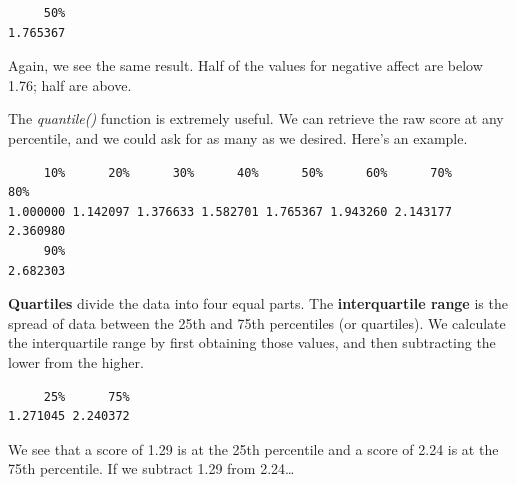 \documentclass[
  11pt,
]{book}
\newenvironment{Shaded}{\begin{snugshade}}{\end{snugshade}}
\newcommand{\AttributeTok}[1]{\textcolor[rgb]{0.27,0.27,0.27}{#1}}
\newcommand{\FloatTok}[1]{\textcolor[rgb]{0.06,0.06,0.06}{#1}}
\newcommand{\FunctionTok}[1]{\textcolor[rgb]{0.27,0.27,0.27}{\textbf{#1}}}
\newcommand{\NormalTok}[1]{#1}
\newcommand{\SpecialCharTok}[1]{\textcolor[rgb]{0.43,0.43,0.43}{\textbf{#1}}}
\begin{document}
\begin{verbatim}
     50% 
1.765367 
\end{verbatim}

Again, we see the same result. Half of the values for negative affect are below 1.76; half are above.

The \emph{quantile()} function is extremely useful. We can retrieve the raw score at any percentile, and we could ask for as many as we desired. Here's an example.

\begin{Shaded}
\end{Shaded}

\begin{verbatim}
     10%      20%      30%      40%      50%      60%      70%      80% 
1.000000 1.142097 1.376633 1.582701 1.765367 1.943260 2.143177 2.360980 
     90% 
2.682303 
\end{verbatim}

\textbf{Quartiles} divide the data into four equal parts. The \textbf{interquartile range} is the spread of data between the 25th and 75th percentiles (or quartiles). We calculate the interquartile range by first obtaining those values, and then subtracting the lower from the higher.

\begin{Shaded}
\end{Shaded}

\begin{verbatim}
     25%      75% 
1.271045 2.240372 
\end{verbatim}

We see that a score of 1.29 is at the 25th percentile and a score of 2.24 is at the 75th percentile. If we subtract 1.29 from 2.24\ldots{}
\end{document}
